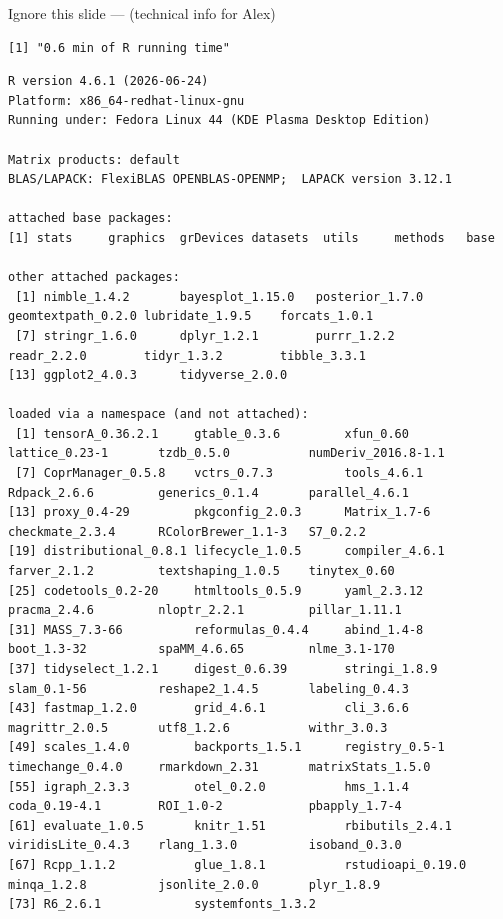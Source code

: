 \documentclass[
  ignorenonframetext,
  aspectratio=169,
  t]{beamer}
\begin{document}
\begin{frame}[fragile]{Ignore this slide --- (technical info for Alex)}
\protect{}\label{ignore-this-slide-technical-info-for-alex}
\tiny

\begin{verbatim}
[1] "0.6 min of R running time"
\end{verbatim}

\begin{verbatim}
R version 4.6.1 (2026-06-24)
Platform: x86_64-redhat-linux-gnu
Running under: Fedora Linux 44 (KDE Plasma Desktop Edition)

Matrix products: default
BLAS/LAPACK: FlexiBLAS OPENBLAS-OPENMP;  LAPACK version 3.12.1

attached base packages:
[1] stats     graphics  grDevices datasets  utils     methods   base     

other attached packages:
 [1] nimble_1.4.2       bayesplot_1.15.0   posterior_1.7.0    geomtextpath_0.2.0 lubridate_1.9.5    forcats_1.0.1     
 [7] stringr_1.6.0      dplyr_1.2.1        purrr_1.2.2        readr_2.2.0        tidyr_1.3.2        tibble_3.3.1      
[13] ggplot2_4.0.3      tidyverse_2.0.0   

loaded via a namespace (and not attached):
 [1] tensorA_0.36.2.1     gtable_0.3.6         xfun_0.60            lattice_0.23-1       tzdb_0.5.0           numDeriv_2016.8-1.1 
 [7] CoprManager_0.5.8    vctrs_0.7.3          tools_4.6.1          Rdpack_2.6.6         generics_0.1.4       parallel_4.6.1      
[13] proxy_0.4-29         pkgconfig_2.0.3      Matrix_1.7-6         checkmate_2.3.4      RColorBrewer_1.1-3   S7_0.2.2            
[19] distributional_0.8.1 lifecycle_1.0.5      compiler_4.6.1       farver_2.1.2         textshaping_1.0.5    tinytex_0.60        
[25] codetools_0.2-20     htmltools_0.5.9      yaml_2.3.12          pracma_2.4.6         nloptr_2.2.1         pillar_1.11.1       
[31] MASS_7.3-66          reformulas_0.4.4     abind_1.4-8          boot_1.3-32          spaMM_4.6.65         nlme_3.1-170        
[37] tidyselect_1.2.1     digest_0.6.39        stringi_1.8.9        slam_0.1-56          reshape2_1.4.5       labeling_0.4.3      
[43] fastmap_1.2.0        grid_4.6.1           cli_3.6.6            magrittr_2.0.5       utf8_1.2.6           withr_3.0.3         
[49] scales_1.4.0         backports_1.5.1      registry_0.5-1       timechange_0.4.0     rmarkdown_2.31       matrixStats_1.5.0   
[55] igraph_2.3.3         otel_0.2.0           hms_1.1.4            coda_0.19-4.1        ROI_1.0-2            pbapply_1.7-4       
[61] evaluate_1.0.5       knitr_1.51           rbibutils_2.4.1      viridisLite_0.4.3    rlang_1.3.0          isoband_0.3.0       
[67] Rcpp_1.1.2           glue_1.8.1           rstudioapi_0.19.0    minqa_1.2.8          jsonlite_2.0.0       plyr_1.8.9          
[73] R6_2.6.1             systemfonts_1.3.2   
\end{verbatim}

\normalsize
\end{frame}
\end{document}
